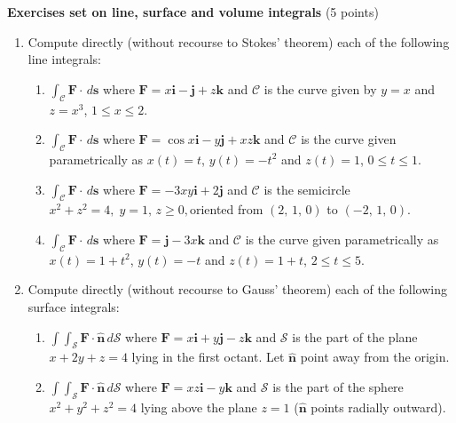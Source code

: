 \documentclass[fleqn]{article}
\begin{document}
  \textbf{Exercises set on line, surface and volume integrals} (5 points)
  \begin{enumerate}

    \item Compute directly (without recourse to Stokes' theorem) each of the following line integrals:
    
      \begin{enumerate}
        \item $\int_{\mathcal{C}}\mathbf{F\cdot }\, d\mathbf{s}$ where $\mathbf{F}=x \mathbf{i}-\mathbf{j}+z\mathbf{k}$ and $\mathcal{C}$ is the curve given by $y=x$ and $z=x^{3}$, $1\leq x\leq 2$.
        
        \item $\int_{\mathcal{C}}\mathbf{F\cdot }\, d\mathbf{s}$ where $\mathbf{F}=\cos x\mathbf{i}-y\mathbf{j}+xz\mathbf{k}$ and $\mathcal{C}$ is the curve given parametrically as $x\left( t\right) =t$, $y\left(t\right) =-t^{2}$ and $z\left( t\right) =1$, $0\leq t\leq 1$.
        
        \item $\int_{\mathcal{C}}\mathbf{F\cdot }\, d\mathbf{s}$ where $\mathbf{F}=-3xy \mathbf{i}+2\mathbf{j}$ and $\mathcal{C}$ is the semicircle $x^{2}+z^{2}=4,\;y=1,\,z\geq 0,$oriented from $\left( 2,\,1,\,0\right) $ to $\left( -2,\,1,\,0\right) .$
        
        \item $\int_{\mathcal{C}}\mathbf{F\cdot }\, d\mathbf{s}$ where $\mathbf{F}= \mathbf{j}-3x\mathbf{k}$ and $\mathcal{C}$ is the curve given parametrically as $x\left( t\right) =1+t^{2}$, $y\left( t\right) =-t$ and $ z\left( t\right) =1+t$, $2\leq t\leq 5$.
      \end{enumerate}
    
    
    \item Compute directly (without recourse to Gauss' theorem) each of the following surface integrals:
    
      \begin{enumerate}
        \item $\int \! \int_{\mathcal{S}}\mathbf{F\cdot \hat{n}}\,d\mathcal{S}$ where $\mathbf{F}=x\mathbf{i}+y\mathbf{j}-z\mathbf{k}$ and $\mathcal{S}$ is the part of the plane $x+2y+z=4$ lying in the first octant.  Let $\mathbf{\hat{n}}$ point away from the origin.
        
        \item $\int \! \int_{\mathcal{S}}\mathbf{F\cdot \hat{n}}\,d\mathcal{S}$ where $\mathbf{F}=xz\mathbf{i}-y\mathbf{k}$ and
        $\mathcal{S}$ is the part of the sphere $x^{2}+y^{2}+z^{2}=4$ lying
        above the plane $z=1$ ($\mathbf{\hat{n}}$ points radially outward).
        

\end{enumerate}
\end{enumerate}
\end{document}
